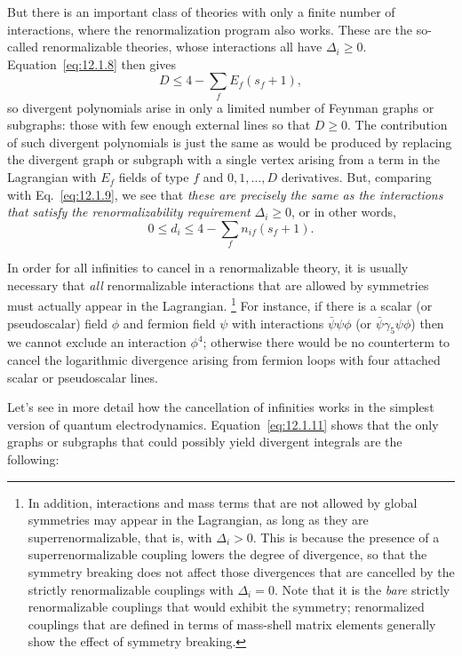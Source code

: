 But there is an important class of theories with only a finite number of
interactions, where the renormalization program also works. These are the
so-called renormalizable theories, whose interactions all have $\Delta_i\geq0$.
Equation~\eqref{eq:12.1.8} then gives
\[
  D\leq4-\sum_f E_f(s_f+1),
\]
so divergent polynomials arise in only a limited number of Feynman graphs or
subgraphs: those with few enough external lines so that $D\geq0$. The
contribution of such divergent polynomials is just the same as would be
produced by replacing the divergent graph or subgraph with a single vertex
arising from a term in the Lagrangian with $E_f$ fields of type $f$ and
$0,1,\ldots,D$ derivatives. But, comparing with Eq.~\eqref{eq:12.1.9}, we see that
\emph{these are precisely the same as the interactions that satisfy the
renormalizability requirement} $\Delta_i\geq0$, or in other words,
\[
  0\leq d_i\leq4-\sum_f n_{if}(s_f+1).
\]

In order for all infinities to cancel in a renormalizable theory, it is
usually necessary that \emph{all} renormalizable interactions that are
allowed by symmetries must actually appear in the Lagrangian.
\footnote{In addition, interactions and mass terms that are not allowed by
global symmetries may appear in the Lagrangian, as long as they are
superrenormalizable, that is, with $\Delta_i>0$. This is because the presence
of a superrenormalizable coupling lowers the degree of divergence, so that
the symmetry breaking does not affect those divergences that are cancelled
by the strictly renormalizable couplings with $\Delta_i=0$. Note that it is
the \emph{bare} strictly renormalizable couplings that would exhibit the
symmetry; renormalized couplings that are defined in terms of mass-shell
matrix elements generally show the effect of symmetry breaking.}
For instance, if there is a scalar (or pseudoscalar) field $\phi$ and fermion
field $\psi$ with interactions $\bar\psi\psi\phi$ (or
$\bar\psi\gamma_5\psi\phi$) then we cannot exclude an interaction $\phi^4$;
otherwise there would be no counterterm to cancel the logarithmic divergence
arising from fermion loops with four attached scalar or pseudoscalar lines.

Let's see in more detail how the cancellation of infinities works in the
simplest version of quantum electrodynamics. Equation~\eqref{eq:12.1.11} shows that
the only graphs or subgraphs that could possibly yield divergent integrals
are the following:

